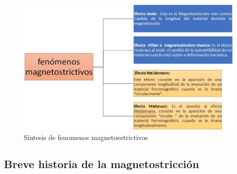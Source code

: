 \begin{figure}[H]
    \centering
    \includegraphics[width=1.1\textwidth]{./Figures/fenomenosMagnetoestrictivos}
	\caption{Síntesis de fenomenos magnetoestrictivos}
	\label{fig:fenomenosMagnetoestrictivos}
\end{figure}


\subsection{Breve historia de la magnetostricción}

